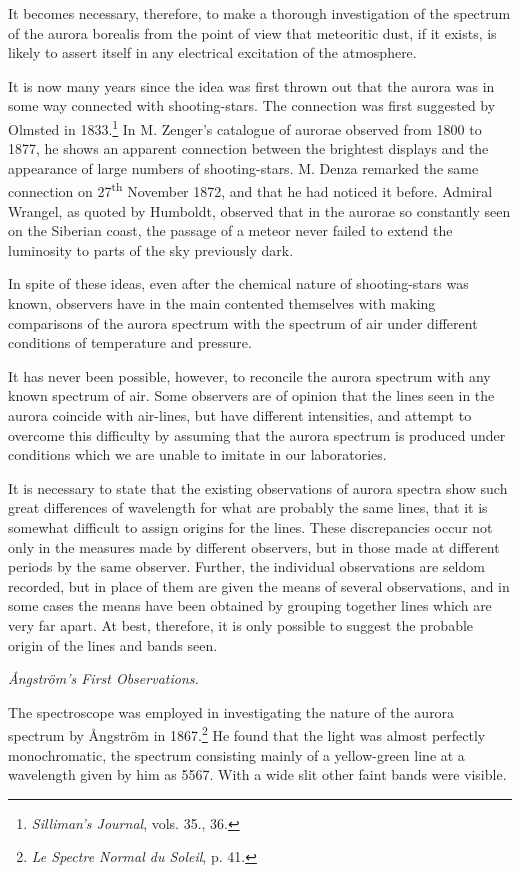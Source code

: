 \documentclass[a4paper, 12pt, oneside, polutonikogreek, english]{article}
\begin{document}
It becomes necessary, therefore, to make a thorough investigation of the spectrum of the aurora borealis from the point of view that meteoritic dust, if it exists, is likely to assert itself in any electrical excitation of the atmosphere.

It is now many years since the idea was first thrown out that the aurora was in some way connected with shooting-stars. The connection was first suggested by Olmsted in 1833.\footnote{\emph{Silliman's Journal}, vols. 35., 36.} In M. Zenger's catalogue of aurorae observed from 1800 to 1877, he shows an apparent connection between the brightest displays and the appearance of large numbers of shooting-stars. M. Denza remarked the same connection on 27\textsuperscript{th} November 1872, and that he had noticed it before. Admiral Wrangel, as quoted by Humboldt, observed that in the aurorae so constantly seen on the Siberian coast, the passage of a meteor never failed to extend the luminosity to parts of the sky previously dark.

In spite of these ideas, even after the chemical nature of shooting-stars was known, observers have in the main contented themselves with making comparisons of the aurora spectrum with the spectrum of air under different conditions of temperature and pressure.

It has never been possible, however, to reconcile the aurora spectrum with any known spectrum of air. Some observers are of opinion that the lines seen in the aurora coincide with air-lines, but have different intensities, and attempt to overcome this difficulty by assuming that the aurora spectrum is produced under conditions which we are unable to imitate in our laboratories.

It is necessary to state that the existing observations of aurora spectra show such great differences of wavelength for what are probably the same lines, that it is somewhat difficult to assign origins for the lines. These discrepancies occur not only in the measures made by different observers, but in those made at different periods by the same observer. Further, the individual observations are seldom recorded, but in place of them are given the means of several observations, and in some cases the means have been obtained by grouping together lines which are very far apart. At best, therefore, it is only possible to suggest the probable origin of the lines and bands seen.

\emph{Ångström's First Observations.}

The spectroscope was employed in investigating the nature of the aurora spectrum by Ångström in 1867.\footnote{\emph{Le Spectre Normal du Soleil}, p. 41.} He found that the light was almost perfectly monochromatic, the spectrum consisting mainly of a yellow-green line at a wavelength given by him as 5567. With a wide slit other faint bands were visible.
\end{document}
